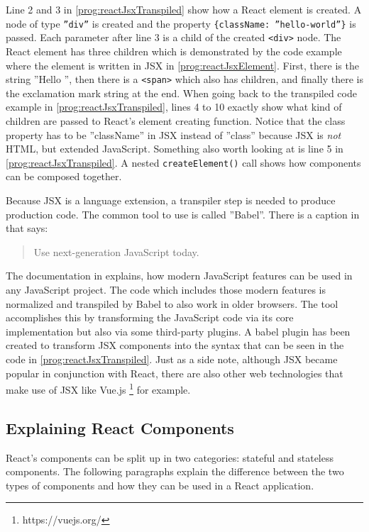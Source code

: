 Line 2 and 3 in \ref{prog:reactJsxTranspiled} show how a React element is created. A node of type \texttt{''div''} is created and the property \texttt{\{className: ''hello-world''\}} is passed. Each parameter after line 3 is a child of the created \texttt{<div>} node. The React element has three children which is demonstrated by the code example where the element is written in JSX in \ref{prog:reactJsxElement}. First, there is the string ''Hello '', then there is a \texttt{<span>} which also has children, and finally there is the exclamation mark string at the end. When going back to the transpiled code example in \ref{prog:reactJsxTranspiled}, lines 4 to 10 exactly show what kind of children are passed to React's element creating function. Notice that the class property has to be ''className'' in JSX instead of ''class'' because JSX is \emph{not} HTML, but extended JavaScript. Something also worth looking at is line 5 in \ref{prog:reactJsxTranspiled}. A nested \texttt{createElement()} call shows how components can be composed together.

Because JSX is a language extension, a transpiler step is needed to produce production code. The common tool to use is called ''Babel''. There is a caption in \cite{Babel} that says: \begin{quote}\begin{english}Use next-generation JavaScript today.\end{english}\end{quote} The documentation in \cite[/docs/en]{Babel} explains, how modern JavaScript features can be used in any JavaScript project. The code which includes those modern features is normalized and transpiled by Babel to also work in older browsers. The tool accomplishes this by transforming the JavaScript code via its core implementation but also via some third-party plugins. A babel plugin has been created to transform JSX components into the syntax that can be seen in the code in \ref{prog:reactJsxTranspiled}. Just as a side note, although JSX became popular in conjunction with React, there are also other web technologies that make use of JSX like Vue.js \footnote{https://vuejs.org/} for example.

\subsection{Explaining React Components}
\label{sec:reactComponents}

React's components can be split up in two categories: stateful and stateless components. The following paragraphs explain the difference between the two types of components and how they can be used in a React application.

